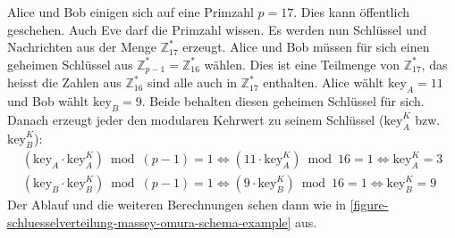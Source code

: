 \begin{example}

Alice und Bob einigen sich auf eine Primzahl $p = 17$. Dies kann öffentlich geschehen. Auch Eve darf die Primzahl wissen. Es werden nun Schlüssel und Nachrichten aus der Menge $\mathbb{Z}_{17}^*$ erzeugt. Alice und Bob müssen für sich einen geheimen Schlüssel aus $\mathbb{Z}_{p-1}^* = \mathbb{Z}_{16}^*$ wählen. Dies ist eine Teilmenge von $\mathbb{Z}_{17}^*$, das heisst die Zahlen aus $\mathbb{Z}_{16}^*$ sind alle auch in  $\mathbb{Z}_{17}^*$ enthalten. Alice wählt $\text{key}_A = 11$ und Bob wählt $\text{key}_B = 9$. Beide behalten diesen geheimen Schlüssel für sich. Danach erzeugt jeder den modularen Kehrwert zu seinem Schlüssel ($\text{key}_A^K$ bzw. $\text{key}_B^K$):
\begin{align*}
	(\text{key}_A \cdot \text{key}_A^K) \bmod (p-1) = 1 \Leftrightarrow (11 \cdot \text{key}_A^K) \bmod 16 = 1 \Leftrightarrow \text{key}_A^K = 3 \\
	(\text{key}_B \cdot \text{key}_B^K) \bmod (p-1) = 1 \Leftrightarrow (9 \cdot \text{key}_B^K) \bmod 16 = 1 \Leftrightarrow \text{key}_B^K = 9
\end{align*}
 Der Ablauf und die weiteren Berechnungen sehen dann wie in \autoref{figure-schluesselverteilung-massey-omura-schema-example} aus.

\begin{figure}[htb]
\end{figure}
\end{example}
